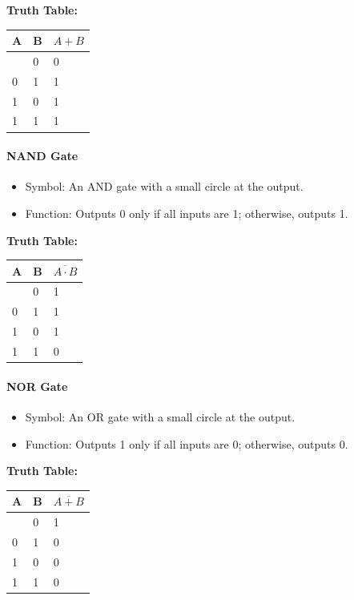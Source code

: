 \documentclass[
  a4paper,
]{article}
\providecommand{\tightlist}{%
  \setlength{\itemsep}{0pt}\setlength{\parskip}{0pt}}
\begin{document}
\textbf{Truth Table:}

\begin{longtable}[]{@{}lll@{}}
\toprule\noalign{}
A & B & \(A + B\) \\
\midrule\noalign{}
\endhead
\bottomrule\noalign{}
\endlastfoot
0 & 0 & 0 \\
0 & 1 & 1 \\
1 & 0 & 1 \\
1 & 1 & 1 \\
\end{longtable}

\paragraph{NAND Gate}\label{nand-gate}

\begin{itemize}
\tightlist
\item
  Symbol: An AND gate with a small circle at the output.
\item
  Function: Outputs 0 only if all inputs are 1; otherwise, outputs 1.
\end{itemize}

\textbf{Truth Table:}

\begin{longtable}[]{@{}lll@{}}
\toprule\noalign{}
A & B & \(\overline{A \cdot B}\) \\
\midrule\noalign{}
\endhead
\bottomrule\noalign{}
\endlastfoot
0 & 0 & 1 \\
0 & 1 & 1 \\
1 & 0 & 1 \\
1 & 1 & 0 \\
\end{longtable}

\paragraph{NOR Gate}\label{nor-gate}

\begin{itemize}
\tightlist
\item
  Symbol: An OR gate with a small circle at the output.
\item
  Function: Outputs 1 only if all inputs are 0; otherwise, outputs 0.
\end{itemize}

\textbf{Truth Table:}

\begin{longtable}[]{@{}lll@{}}
\toprule\noalign{}
A & B & \(\overline{A + B}\) \\
\midrule\noalign{}
\endhead
\bottomrule\noalign{}
\endlastfoot
0 & 0 & 1 \\
0 & 1 & 0 \\
1 & 0 & 0 \\
1 & 1 & 0 \\
\end{longtable}
\end{document}
